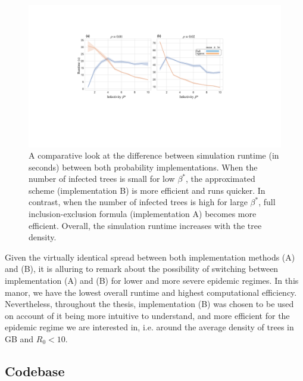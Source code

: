 \begin{figure}
    \centering
    \includegraphics[scale=0.425]{appendix/figures/runtime-comp.pdf}
    \caption{A comparative look at the difference between simulation runtime (in seconds) between both probability implementations.
    When the number of infected trees is small for low $\beta^*$, the approximated scheme (implementation B) is more efficient and runs quicker. 
    In contrast, when the number of infected trees is high for large $\beta^*$, full inclusion-exclusion formula (implementation A) becomes more efficient.
    Overall, the simulation runtime increases with the tree density.
    }
    \label{fig:imp-runtime}
\end{figure}

Given the virtually identical spread between both implementation methods (A) and (B), it is alluring to remark about the possibility of switching between implementation (A) and (B) 
for lower and more severe epidemic regimes. 
In this manor, we have the lowest overall runtime and highest computational efficiency. 
Nevertheless, throughout the thesis, implementation (B) was chosen to be used on account of it being more intuitive to understand, and more efficient for the epidemic regime we are interested in, i.e. around the average density of trees in GB and $R_0 < 10$. 

\subsection{Codebase}

